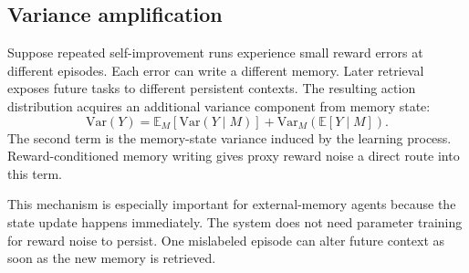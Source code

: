 \subsection{Variance amplification}
Suppose repeated self-improvement runs experience small reward errors at different episodes. Each error can write a different memory. Later retrieval exposes future tasks to different persistent contexts. The resulting action distribution acquires an additional variance component from memory state:
\begin{equation}
\mathrm{Var}(Y)=
\mathbb{E}_{M}[\mathrm{Var}(Y\mid M)]
+\mathrm{Var}_{M}(\mathbb{E}[Y\mid M]).
\label{eq:variance}
\end{equation}
The second term is the memory-state variance induced by the learning process. Reward-conditioned memory writing gives proxy reward noise a direct route into this term.

This mechanism is especially important for external-memory agents because the state update happens immediately. The system does not need parameter training for reward noise to persist. One mislabeled episode can alter future context as soon as the new memory is retrieved.
